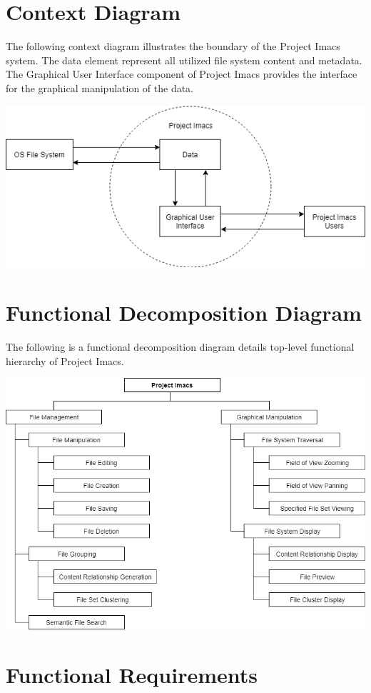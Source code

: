 \documentclass{article}
\begin{document}
\section{Context Diagram}
The following context diagram illustrates the boundary of the Project Imacs system. The data element represent all utilized file system content and metadata. The Graphical User Interface component of Project Imacs provides the interface for the graphical manipulation of the data.

\includegraphics[scale=0.5]{context_diagram.png}

\section{Functional Decomposition Diagram}
The following is a functional decomposition diagram details top-level functional hierarchy of Project Imacs.

\includegraphics[scale=0.5]{functional_decomposition_diagram.png}

\section{Functional Requirements}
\end{document}
